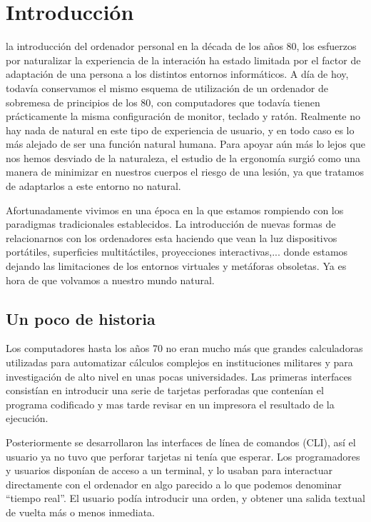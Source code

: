 \chapter{Introducción}
 la introducción del ordenador personal en la década de los años 80, los esfuerzos por naturalizar la experiencia de la interación ha estado limitada por el factor de adaptación de una persona a los distintos entornos informáticos. A día de hoy, todavía conservamos el mismo esquema de utilización de un ordenador de sobremesa de principios de los 80, con computadores que todavía tienen prácticamente la misma configuración de monitor, teclado y ratón. Realmente no hay nada de natural en este tipo de experiencia de usuario, y en todo caso es lo más alejado de ser una función natural humana. Para apoyar aún más lo lejos que nos hemos desviado de la naturaleza, el estudio de la ergonomía surgió como una manera de minimizar en nuestros cuerpos el riesgo de una lesión, ya que tratamos de adaptarlos a este entorno no natural.

Afortunadamente vivimos en una época en la que estamos rompiendo con los paradigmas tradicionales establecidos. La introducción de nuevas formas de relacionarnos con los ordenadores esta haciendo que vean la luz dispositivos portátiles, superficies multitáctiles, proyecciones interactivas,... donde estamos dejando las limitaciones de los entornos virtuales y metáforas obsoletas. Ya es hora de que volvamos a nuestro mundo natural.

\section{Un poco de historia}
Los computadores hasta los años 70 no eran mucho más que grandes calculadoras utilizadas para automatizar cálculos complejos en instituciones militares y para investigación de alto nivel en unas pocas universidades. Las primeras interfaces consistían en introducir una serie de tarjetas perforadas que contenían el programa codificado y mas tarde revisar en un impresora el resultado de la ejecución.

Posteriormente se desarrollaron las interfaces de línea de comandos (CLI), así el usuario ya no tuvo que perforar tarjetas ni tenía que esperar. Los programadores y usuarios disponían de acceso a un terminal, y lo usaban para interactuar directamente con el ordenador en algo parecido a lo que podemos denominar ``tiempo real''. El usuario podía introducir una orden, y obtener una salida textual de vuelta más o menos inmediata.

